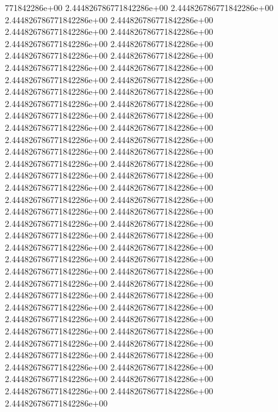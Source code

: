 771842286e+00	2.444826786771842286e+00	2.444826786771842286e+00	2.444826786771842286e+00	2.444826786771842286e+00	2.444826786771842286e+00	2.444826786771842286e+00	2.444826786771842286e+00	2.444826786771842286e+00	2.444826786771842286e+00	2.444826786771842286e+00	2.444826786771842286e+00	2.444826786771842286e+00	2.444826786771842286e+00	2.444826786771842286e+00	2.444826786771842286e+00	2.444826786771842286e+00	2.444826786771842286e+00	2.444826786771842286e+00	2.444826786771842286e+00	2.444826786771842286e+00	2.444826786771842286e+00	2.444826786771842286e+00	2.444826786771842286e+00	2.444826786771842286e+00	2.444826786771842286e+00	2.444826786771842286e+00	2.444826786771842286e+00	2.444826786771842286e+00	2.444826786771842286e+00	2.444826786771842286e+00	2.444826786771842286e+00	2.444826786771842286e+00	2.444826786771842286e+00	2.444826786771842286e+00	2.444826786771842286e+00	2.444826786771842286e+00	2.444826786771842286e+00	2.444826786771842286e+00	2.444826786771842286e+00	2.444826786771842286e+00	2.444826786771842286e+00	2.444826786771842286e+00	2.444826786771842286e+00	2.444826786771842286e+00	2.444826786771842286e+00	2.444826786771842286e+00	2.444826786771842286e+00	2.444826786771842286e+00	2.444826786771842286e+00	2.444826786771842286e+00	2.444826786771842286e+00	2.444826786771842286e+00	2.444826786771842286e+00	2.444826786771842286e+00	2.444826786771842286e+00	2.444826786771842286e+00	2.444826786771842286e+00	2.444826786771842286e+00	2.444826786771842286e+00	2.444826786771842286e+00	2.444826786771842286e+00	2.444826786771842286e+00	2.444826786771842286e+00	2.444826786771842286e+00	2.444826786771842286e+00	2.444826786771842286e+00	2.444826786771842286e+00
